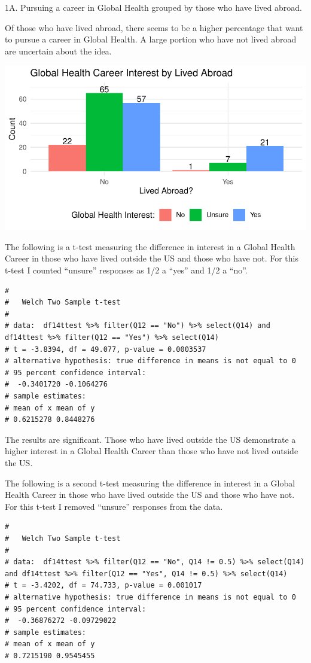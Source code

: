 \documentclass[
  letterpaper,
  DIV=11,
  numbers=noendperiod]{scrartcl}
\begin{document}
\newpage

1A. Pursuing a career in Global Health grouped by those who have lived
abroad.

Of those who have lived abroad, there seems to be a higher percentage
that want to pursue a career in Global Health. A large portion who have
not lived abroad are uncertain about the idea.

\includegraphics{GlobalHealthQuartoHC_files/figure-pdf/unnamed-chunk-14-1.pdf}

\newpage

The following is a t-test measuring the difference in interest in a
Global Health Career in those who have lived outside the US and those
who have not. For this t-test I counted ``unsure'' responses as 1/2 a
``yes'' and 1/2 a ``no''.

\begin{verbatim}
# 
#   Welch Two Sample t-test
# 
# data:  df14ttest %>% filter(Q12 == "No") %>% select(Q14) and df14ttest %>% filter(Q12 == "Yes") %>% select(Q14)
# t = -3.8394, df = 49.077, p-value = 0.0003537
# alternative hypothesis: true difference in means is not equal to 0
# 95 percent confidence interval:
#  -0.3401720 -0.1064276
# sample estimates:
# mean of x mean of y 
# 0.6215278 0.8448276
\end{verbatim}

The results are significant. Those who have lived outside the US
demonstrate a higher interest in a Global Health Career than those who
have not lived outside the US.

The following is a second t-test measuring the difference in interest in
a Global Health Career in those who have lived outside the US and those
who have not. For this t-test I removed ``unsure'' responses from the
data.

\begin{verbatim}
# 
#   Welch Two Sample t-test
# 
# data:  df14ttest %>% filter(Q12 == "No", Q14 != 0.5) %>% select(Q14) and df14ttest %>% filter(Q12 == "Yes", Q14 != 0.5) %>% select(Q14)
# t = -3.4202, df = 74.733, p-value = 0.001017
# alternative hypothesis: true difference in means is not equal to 0
# 95 percent confidence interval:
#  -0.36876272 -0.09729022
# sample estimates:
# mean of x mean of y 
# 0.7215190 0.9545455
\end{verbatim}
\end{document}
